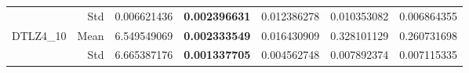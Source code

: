 \begin{table*}[htbp]
\begin{tabular}{rrrrrrr}
          & Std   & 0.006621436 & \textbf{0.002396631} & \multicolumn{1}{c}{0.012386278} & 0.010353082 & 0.006864355 \\
    \multirow{2}[0]{*}{DTLZ4\_10} & Mean  & 6.549549069 & \textbf{0.002333549} & \multicolumn{1}{c}{0.016430909} & 0.328101129 & 0.260731698 \\
          & Std   & 6.665387176 & \textbf{0.001337705} & \multicolumn{1}{c}{0.004562748} & 0.007892374 & 0.007115335 \\
    \bottomrule
    \end{tabular}%
  \label{tab:dtlzmanyGD}%
\end{table*}%
